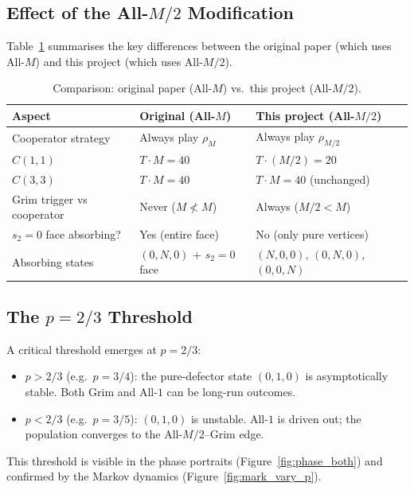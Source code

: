 \documentclass[12pt,a4paper]{article}
\begin{document}
\subsection{Effect of the All-\texorpdfstring{$M/2$}{M/2} Modification}

Table~\ref{tab:differences} summarises the key differences between the
original paper (which uses All-$M$) and this project (which uses All-$M/2$).

\begin{table}[H]
\centering
\caption{Comparison: original paper (All-$M$) vs.\ this project (All-$M/2$).}
\label{tab:differences}
\small
\begin{tabular}{lll}
\toprule
Aspect & Original (All-$M$) & This project (All-$M/2$) \\
\midrule
Cooperator strategy       & Always play $\rho_M$       & Always play $\rho_{M/2}$ \\
$C(1,1)$                  & $T \cdot M = 40$           & $T \cdot (M/2) = 20$ \\
$C(3,3)$                  & $T \cdot M = 40$           & $T \cdot M = 40$ (unchanged) \\
Grim trigger vs cooperator & Never ($M \not< M$)        & Always ($M/2 < M$) \\
$s_2{=}0$ face absorbing? & Yes (entire face)          & No (only pure vertices) \\
Absorbing states          & $(0,N,0)$ + $s_2{=}0$ face & $(N,0,0)$, $(0,N,0)$, $(0,0,N)$ \\
\bottomrule
\end{tabular}
\end{table}

\subsection{The \texorpdfstring{$p = 2/3$}{p = 2/3} Threshold}

A critical threshold emerges at $p = 2/3$:
\begin{itemize}
  \item $p > 2/3$ (e.g.\ $p = 3/4$): the pure-defector state $(0,1,0)$ is
        asymptotically stable. Both Grim and All-$1$ can be long-run outcomes.
  \item $p < 2/3$ (e.g.\ $p = 3/5$): $(0,1,0)$ is unstable. All-$1$ is
        driven out; the population converges to the All-$M/2$--Grim edge.
\end{itemize}
This threshold is visible in the phase portraits (Figure~\ref{fig:phase_both})
and confirmed by the Markov dynamics (Figure~\ref{fig:mark_vary_p}).
\end{document}

